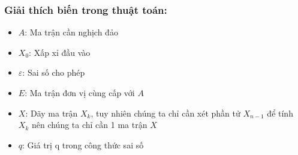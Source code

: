         \subsubsection{Giải thích biến trong thuật toán:}
            \begin{itemize}
                \item $A$: Ma trận cần nghịch đảo
                \item $X_{0}$: Xấp xỉ đầu vào
                \item $\varepsilon$: Sai số cho phép
                \item $E$: Ma trận đơn vị cùng cấp với $A$
                \item $X$: Dãy ma trận $X_{k}$, tuy nhiên chúng ta chỉ cần xét phần tử $X_{n-1}$ để tính $X_{k}$ nên chúng ta chỉ cần 1 ma trận $X$
                \item $q$: Giá trị q trong công thức sai số
            \end{itemize}

        
        



